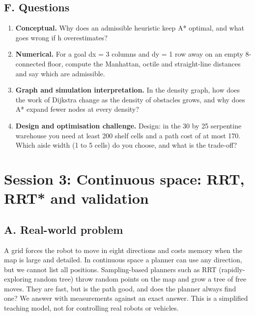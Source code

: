 \documentclass[11pt,a4paper]{article}
\begin{document}
\subsection*{F. Questions}
\begin{enumerate}[nosep]
\item \textbf{Conceptual.} Why does an admissible heuristic keep A* optimal, and what goes wrong if h overestimates?
\item \textbf{Numerical.} For a goal dx = 3 columns and dy = 1 row away on an empty 8-connected floor, compute the Manhattan, octile and straight-line distances and say which are admissible.
\item \textbf{Graph and simulation interpretation.} In the density graph, how does the work of Dijkstra change as the density of obstacles grows, and why does A* expand fewer nodes at every density?
\item \textbf{Design and optimisation challenge.} Design: in the 30 by 25 serpentine warehouse you need at least 200 shelf cells and a path cost of at most 170. Which aisle width (1 to 5 cells) do you choose, and what is the trade-off?
\end{enumerate}

\section{Session 3: Continuous space: RRT, RRT* and validation}

\subsection*{A. Real-world problem}
A grid forces the robot to move in eight directions and costs memory when the map is large and detailed. In continuous space a planner can use any direction, but we cannot list all positions. Sampling-based planners such as RRT (rapidly-exploring random tree) throw random points on the map and grow a tree of free moves. They are fast, but is the path good, and does the planner always find one? We answer with measurements against an exact answer. This is a simplified teaching model, not for controlling real robots or vehicles.
\end{document}
